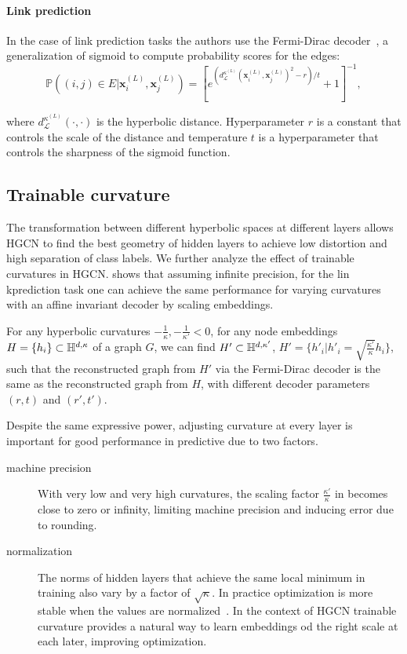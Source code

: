 \paragraph{Link prediction}
In the case of link prediction tasks the authors use the Fermi-Dirac decoder~\cite{Krioukov2010HyperbolicGeometryComplexNetworks}\cite{nickel2017poincare}, a generalization of sigmoid to compute probability scores for the edges:
\begin{equation*}
    \mathbb{P}\left((i, j) \in E|\mathbf{x}_i^{(L)}, \mathbf{x}_j^{(L)}\right) = \left[e^{(d^{\kappa^(L)}_{\mathcal{L}}(\mathbf{x}^{(L)}_i, \mathbf{x}^{(L)}_j)^2-r)/t} + 1\right]^{-1},
\end{equation*}

where $d^{\kappa^(L)}_{\mathcal{L}}(\cdot, \cdot)$ is the hyperbolic distance. Hyperparameter $r$ is a constant that controls the scale of the distance and temperature $t$ is a hyperparameter that controls the sharpness of the sigmoid function.

\subsection{Trainable curvature}
The transformation between different hyperbolic spaces at different layers allows HGCN to find the best geometry of hidden layers to achieve low distortion and high separation of class labels. We further analyze the effect of trainable curvatures in HGCN.  shows that assuming infinite precision, for the lin kprediction task one can achieve the same performance for varying curvatures with an affine invariant decoder by scaling embeddings.

\begin{theorem}\label{th:HGCNcurvature}
    For any hyperbolic curvatures $-\frac{1}{\kappa}, -\frac{1}{\kappa'} < 0$, for any node embeddings $H = \{h_i\} \subset \mathbb{H}^{d,\kappa}$ of a graph $G$, we can find $H' \subset \mathbb{H}^{d,\kappa'}$, $H' = \{h'_i | h'_i = \sqrt{\frac{\kappa'}{\kappa}}h_i\}$, such that the reconstructed graph from $H'$ via the Fermi-Dirac decoder is the same as the reconstructed graph from $H$, with different decoder parameters $(r, t)$ and $(r', t')$.    
\end{theorem}

Despite the same expressive power, adjusting curvature at every layer is important for good performance in predictive due to two factors.
\begin{description}
    \item[machine precision] With very low and very high curvatures, the scaling factor $\frac{\kappa'}{\kappa}$ in  becomes close to zero or infinity, limiting machine precision and inducing error due to rounding.
    \item[normalization] The norms of hidden layers that achieve the same local minimum in training also vary by a factor of $\sqrt{\kappa}$. In practice optimization is more stable when the values are normalized~\cite{ioffe2015batchNormalization}. In the context of HGCN trainable curvature provides a natural way to learn embeddings od the right scale at each later, improving optimization.
\end{description}